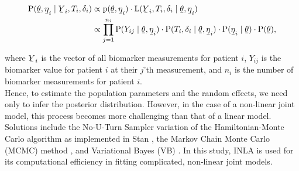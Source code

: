 \documentclass[english]{article}
\newcommand{\ubar}[1]{\text{\b{$#1$}}}
\theoremstyle{plain}
\begin{document}
\begin{align}
\mathrm{P}(\ubar{\theta}, \ubar{\eta}_i \mid \ubar{Y}_i, T_i, \delta_i) &\propto
\mathrm{p}(\ubar{\theta}, \ubar{\eta}_i) \cdot
\mathrm{L}(\ubar{Y}_i, T_i, \delta_i \mid \ubar{\theta}, \ubar{\eta}_i) \nonumber \\  &\propto
\prod_{j = 1}^{n_i} \mathrm{P}(Y_{ij} \mid \ubar{\theta}, \ubar{\eta}_i) \cdot
\mathrm{P}(T_i, \delta_i \mid \ubar{\theta}, \ubar{\eta}_i) \cdot
\mathrm{P}(\ubar{\eta}_i \mid \ubar{\theta}) \cdot \mathrm{P}(\ubar{\theta}),
\end{align}


where $\ubar{Y}_i$ is the vector of all biomarker measurements for patient $i$, $Y_{ij}$ is the biomarker value for patient $i$ at their $j$'th measurement, and $n_i$ is the number of biomarker measurements for patient $i$.
\\

Hence, to estimate the population parameters and the random effects, we need only to infer the posterior distribution. However, in the case of a non-linear joint model, this process becomes more challenging than that of a linear model. Solutions include the No-U-Turn Sampler variation of the Hamiltonian-Monte Carlo algorithm as implemented in Stan \cite{Marion2022}, the Markov Chain Monte Carlo (MCMC) method \cite{Marion2022}, and Variational Bayes (VB) \cite{VB}. In this study, INLA \cite{INLA2020} is used for its computational efficiency  in fitting complicated, non-linear joint models.
\end{document}
